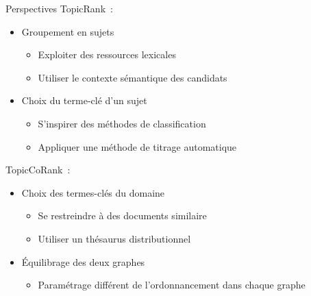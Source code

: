   \begin{frame}{Perspectives}
    TopicRank~:
    \begin{itemize}
      \item{Groupement en sujets}
      \begin{itemize}
        \item{Exploiter des ressources lexicales}
        \item{Utiliser le contexte sémantique des candidats}
      \end{itemize}
      \item{Choix du terme-clé d'un sujet}
      \begin{itemize}
        \item{S'inspirer des méthodes de classification}
        \item{Appliquer une méthode de titrage automatique}
      \end{itemize}
    \end{itemize}

  \vspace{1em}

    TopicCoRank~:
    \begin{itemize}
      \item{Choix des termes-clés du domaine}
      \begin{itemize}
        \item{Se restreindre à des documents similaire}
        \item{Utiliser un thésaurus distributionnel}
      \end{itemize}
      \item{Équilibrage des deux graphes}
      \begin{itemize}
        \item{Paramétrage différent de l'ordonnancement dans chaque graphe}
      \end{itemize}
    \end{itemize}
  \end{frame}

